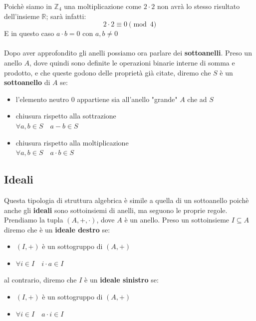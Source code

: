 Poichè siamo in \(\mathbb{Z}_4\) una moltiplicazione come
\(2 \cdot 2\) non avrà lo stesso risultato dell'insieme \(\mathbb{R}\); 
sarà infatti:
\[ 2 \cdot 2 \equiv 0 \pmod{4}\]
E in questo caso \(a \cdot b = 0\) con \(a, b \neq 0\)
\\
\\
Dopo aver approfondito gli anelli possiamo ora parlare dei \textbf{sottoanelli}.
Preso un anello \(A\), dove quindi sono definite le operazioni binarie interne 
di somma e prodotto, e che queste godono delle proprietà già citate, diremo che 
\(S\) è un \textbf{sottoanello} di \(A\) se:

\begin{itemize}
  \item l'elemento neutro \(0\) appartiene sia all'anello "grande" \(A\)
  che ad \(S\)

  \item chiusura rispetto alla sottrazione \\
  \( \forall a,b \in S \quad a - b \in S \)

  \item chiusura rispetto alla moltiplicazione \\
  \( \forall a,b \in S \quad a \cdot b \in S \)
\end{itemize}

\subsection{Ideali}
Questa tipologia di struttura algebrica è simile a quella di un sottoanello poichè
anche gli \textbf{ideali} sono sottoinsiemi di anelli, ma seguono le proprie regole. \\
Prendiamo la tupla \( (A, +, \cdot) \), dove \(A\) è un anello. Preso un sottoinsieme 
\(I \subseteq A\) diremo che è un \textbf{ideale destro} se:

\begin{itemize}
  \item \( (I, +) \) è un sottogruppo di \( (A, +) \)
  \item \( \forall i \in I \quad i \cdot a \in I \)
\end{itemize}

al contrario, diremo che \(I\) è un \textbf{ideale sinistro} se:

\begin{itemize}
  \item \( (I, +) \) è un sottogruppo di \( (A, +) \)
  \item \( \forall i \in I \quad a \cdot i \in I \)
\end{itemize}

